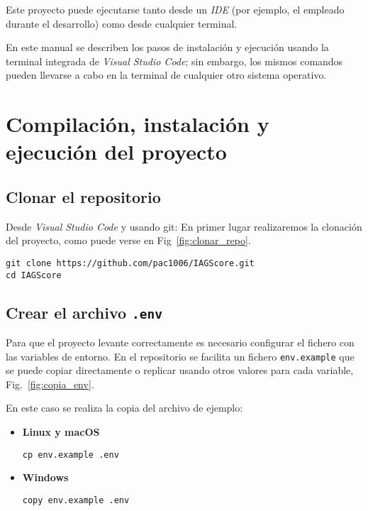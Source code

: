 
Este proyecto puede ejecutarse tanto desde un \textit{IDE} (por ejemplo, el empleado durante el desarrollo) como desde cualquier terminal. 

En este manual se describen los pasos de instalación y ejecución usando la terminal integrada de \textit{Visual Studio Code}; sin embargo, 
los mismos comandos pueden llevarse a cabo en la terminal de cualquier otro sistema operativo.

\section{Compilación, instalación y ejecución del proyecto}\label{sec:instalacion}

\subsection{Clonar el repositorio}

Desde \textit{Visual Studio Code} y usando git:
En primer lugar realizaremos la clonación del proyecto, como puede verse en Fig~\ref{fig:clonar_repo}.

\begin{verbatim}
git clone https://github.com/pac1006/IAGScore.git
cd IAGScore
\end{verbatim}


\subsection{Crear el archivo \texttt{.env}}

Para que el proyecto levante correctamente es necesario configurar el fichero con
las variables de entorno. En el repositorio se facilita un fichero \texttt{env.example}
que se puede copiar directamente o replicar usando otros valores para cada variable, Fig.~\ref{fig:copia_env}.

En este caso se realiza la copia del archivo de ejemplo:

\begin{itemize}
    \item \textbf{Linux y macOS}
    \begin{verbatim}
cp env.example .env
    \end{verbatim}
    \item \textbf{Windows}
    \begin{verbatim}
copy env.example .env
    \end{verbatim}
\end{itemize}

